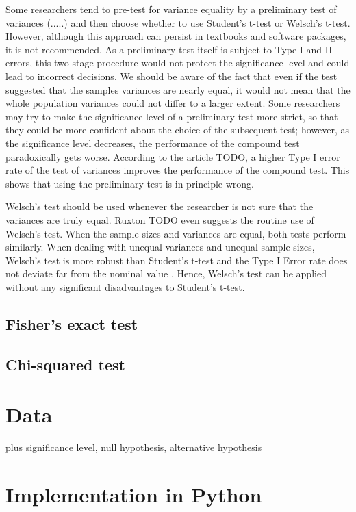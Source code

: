 Some researchers tend to pre-test for variance equality by a preliminary test of variances (.....) and then choose whether to use Student's t-test or Welsch's t-test. However, although this approach can persist in textbooks and software packages, it is not recommended. As a preliminary test itself is subject to Type I and II errors, this two-stage procedure would not protect the significance level and could lead to incorrect decisions. We should be aware of the fact that even if the test suggested that the samples variances are nearly equal, it would not mean that the whole population variances could not differ to a larger extent. \cite{zimmerman} Some researchers may try to make the significance level of a preliminary test more strict, so that they could be more confident about the choice of the subsequent test; however, as the significance level decreases, the performance of the compound test paradoxically gets worse. According to the article \cite{zimmerman} TODO, a higher Type I error rate of the test of variances improves the performance of the compound test. This shows that using the preliminary test is in principle wrong.

Welsch's test should be used whenever the researcher is not sure that the variances are truly equal. Ruxton \cite{ruxton} TODO even suggests the routine use of Welsch's test. When the sample sizes and variances are equal, both tests perform similarly. When dealing with unequal variances and unequal sample sizes, Welsch's test is more robust than Student's t-test and the Type I Error rate does not deviate far from the nominal value \cite{derrick}. Hence, Welsch's test can be applied without any significant disadvantages to Student's t-test.

\subsection{Fisher's exact test}

\subsection{Chi-squared test}




\section{Data}
plus significance level, null hypothesis, alternative hypothesis


\section{Implementation in Python}



